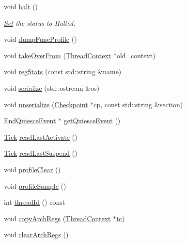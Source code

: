 \begin{DoxyCompactItemize}
void \hyperlink{classOzoneCPU_1_1OzoneTC_ade0430439247877006d7df950f94918a}{halt} ()
\begin{DoxyCompactList}\small\item\em \hyperlink{classSet}{Set} the status to Halted. \item\end{DoxyCompactList}\item 
void \hyperlink{classOzoneCPU_1_1OzoneTC_a13fa12d1779a94a1e0b968946a1367c7}{dumpFuncProfile} ()
\item 
void \hyperlink{classOzoneCPU_1_1OzoneTC_af121f4812cba8e37d675cddada8e47ed}{takeOverFrom} (\hyperlink{classThreadContext}{ThreadContext} $\ast$old\_\-context)
\item 
void \hyperlink{classOzoneCPU_1_1OzoneTC_a3dd3443357312bcb75580eaa508c48a4}{regStats} (const std::string \&name)
\item 
void \hyperlink{classOzoneCPU_1_1OzoneTC_a53e036786d17361be4c7320d39c99b84}{serialize} (std::ostream \&os)
\item 
void \hyperlink{classOzoneCPU_1_1OzoneTC_af22e5d6d660b97db37003ac61ac4ee49}{unserialize} (\hyperlink{classCheckpoint}{Checkpoint} $\ast$cp, const std::string \&section)
\item 
\hyperlink{classEndQuiesceEvent}{EndQuiesceEvent} $\ast$ \hyperlink{classOzoneCPU_1_1OzoneTC_a62d5bde0391e38cd7463a35e98d5c742}{getQuiesceEvent} ()
\item 
\hyperlink{base_2types_8hh_a5c8ed81b7d238c9083e1037ba6d61643}{Tick} \hyperlink{classOzoneCPU_1_1OzoneTC_afaa8f9eb8d809cccd31829ba793a433a}{readLastActivate} ()
\item 
\hyperlink{base_2types_8hh_a5c8ed81b7d238c9083e1037ba6d61643}{Tick} \hyperlink{classOzoneCPU_1_1OzoneTC_a7d0b0631c7087d361f6ae11379c06b15}{readLastSuspend} ()
\item 
void \hyperlink{classOzoneCPU_1_1OzoneTC_acf9c88860776d7bd752317e8b550a5d5}{profileClear} ()
\item 
void \hyperlink{classOzoneCPU_1_1OzoneTC_aba547b904bdcf83196f983f79d285caf}{profileSample} ()
\item 
int \hyperlink{classOzoneCPU_1_1OzoneTC_afc38d04c77e7b5fc3bbb0dd00fc87742}{threadId} () const 
\item 
void \hyperlink{classOzoneCPU_1_1OzoneTC_a01b372f805c92c90e6148b76d23d6236}{copyArchRegs} (\hyperlink{classThreadContext}{ThreadContext} $\ast$\hyperlink{classOzoneCPU_a4455a4759e69e5ebe68ae7298cbcc37d}{tc})
\item 
void \hyperlink{classOzoneCPU_1_1OzoneTC_ad5c88ea41846742bd8c70d9c50f31945}{clearArchRegs} ()

\end{DoxyCompactItemize}
